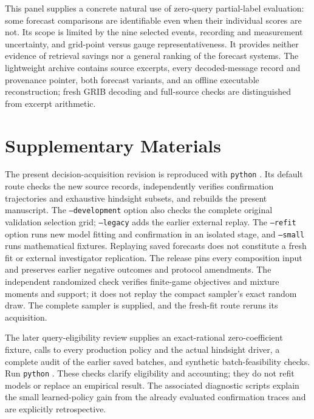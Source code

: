 \documentclass[12pt]{article}
\begin{document}
This panel supplies a concrete natural use of zero-query partial-label
evaluation: some forecast comparisons are identifiable even when their
individual scores are not. Its scope is limited by the nine selected events,
recording and measurement uncertainty, and grid-point versus gauge
representativeness. It provides neither evidence of retrieval savings nor
a general ranking of the forecast systems. The lightweight archive contains
source excerpts, every decoded-message record and provenance pointer, both
forecast variants, and an offline executable reconstruction; fresh GRIB
decoding and full-source checks are distinguished from excerpt arithmetic.


\FloatBarrier
\section*{Supplementary Materials}
The present decision-acquisition revision is reproduced with
\texttt{python} . Its default route
checks the new source records, independently verifies confirmation trajectories
and exhaustive hindsight subsets, and rebuilds the present manuscript.
The \texttt{--development} option also checks the complete original validation
selection grid; \texttt{--legacy} adds the earlier external replay.
The \texttt{--refit} option runs new model fitting and confirmation in an
isolated stage, and \texttt{--small} runs mathematical fixtures. Replaying
saved forecasts does not constitute a fresh fit or external investigator
replication. The release pins every composition input and preserves earlier
negative outcomes and protocol amendments.
The independent randomized check verifies finite-game objectives and mixture
moments and support; it does not replay the compact sampler's exact random
draw. The complete sampler is supplied, and the fresh-fit route reruns its
acquisition.

The later query-eligibility review supplies an exact-rational
zero-coefficient fixture, calls to every production policy and the actual
hindsight driver, a complete audit of the earlier saved batches, and
synthetic batch-feasibility checks. Run
\texttt{python} .
These checks clarify eligibility and accounting; they do not refit models
or replace an empirical result. The associated diagnostic scripts explain
the small learned-policy gain from the already evaluated confirmation
traces and are explicitly retrospective.
\end{document}
